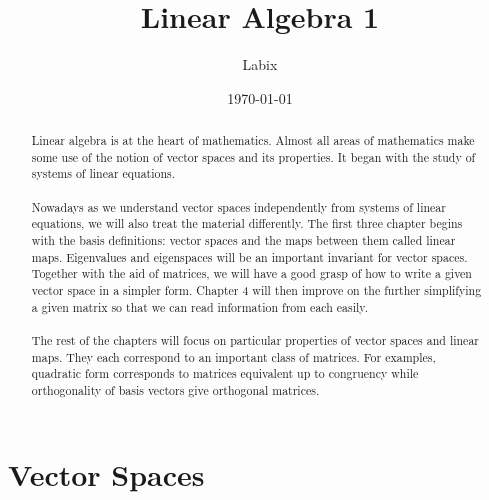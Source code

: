\documentclass[a4paper]{article}
\title{Linear Algebra 1}
\author{Labix}
\date{\today}
\begin{document}
\maketitle
\begin{abstract}
Linear algebra is at the heart of mathematics. Almost all areas of mathematics make some use of the notion of vector spaces and its properties. It began with the study of systems of linear equations. \\~\\

Nowadays as we understand vector spaces independently from systems of linear equations, we will also treat the material differently. The first three chapter begins with the basis definitions: vector spaces and the maps between them called linear maps. Eigenvalues and eigenspaces will be an important invariant for vector spaces. Together with the aid of matrices, we will have a good grasp of how to write a given vector space in a simpler form. Chapter 4 will then improve on the further simplifying a given matrix so that we can read information from each easily. \\~\\

The rest of the chapters will focus on particular properties of vector spaces and linear maps. They each correspond to an important class of matrices. For examples, quadratic form corresponds to matrices equivalent up to congruency while orthogonality of basis vectors give orthogonal matrices. 
\end{abstract}
\pagebreak
\tableofcontents
\pagebreak

\section{Vector Spaces}
\end{document}
